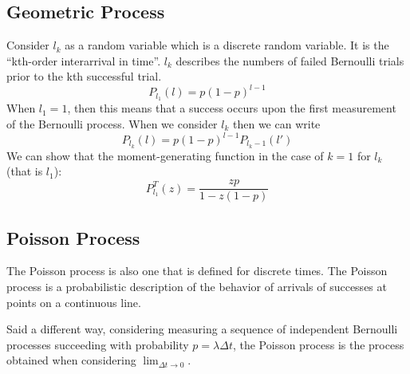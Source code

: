 \documentclass{article}
\begin{document}
\subsection{Geometric Process}
\label{sub:geometric_process}

Consider $ l_{k} $ as a random variable which is a discrete random variable. It
is the ``kth-order interarrival in time''. $ l_{k} $ describes the numbers of
failed Bernoulli trials prior to the kth successful trial.
\[
   P_{l_{1}}(l) = p \left( 1 - p \right)^{l-1}
\]
When $ l_{1} = 1 $, then this means that a success occurs upon the
first measurement of the Bernoulli process. When we consider $ l_{k} $ then we
can write
\[
   P_{l_{k}}(l) = p \left( 1-p \right)^{l-1} P_{l_{k} - 1}(l')
\]
We can show that the moment-generating function in the case of $ k = 1 $ for $
l_k $ (that is $ l_{1} $):
\[
   P_{l_{1}}^{T}(z) = \frac{z p}{1 - z \left( 1-p \right)}
\]

\subsection{Poisson Process}
\label{sub:poisson_process}

The Poisson process is also one that is defined for discrete times. The Poisson
process is a probabilistic description of the behavior of arrivals of successes
at points on a continuous line.

Said a different way, considering measuring a
sequence of independent Bernoulli processes succeeding with probability $ p =
\lambda \Delta t $, the Poisson process is the process obtained when considering
$\lim_{\Delta t \to 0}$.
\end{document}
